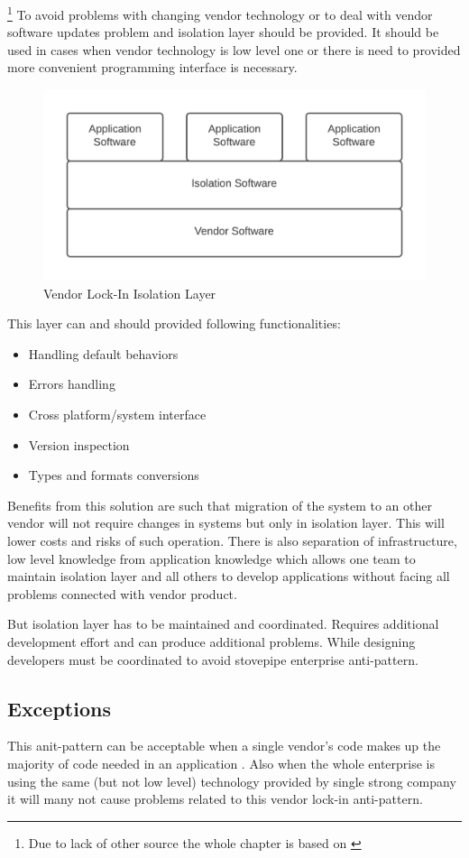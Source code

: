 \footnote{Due to lack of other source the whole chapter is based on \cite{SurvivalGuide}}
To avoid problems with changing vendor technology or to deal with vendor software updates problem and isolation layer should be provided. It should be used in cases when vendor technology is low level one or there is need to provided more convenient programming interface is necessary.

\begin{figure}[!h]
    \centering
    \includegraphics[scale=0.3]{Images/vendorsolution.png}
    \caption[Vendor Lock-In Isolation Layer]{Vendor Lock-In Isolation Layer \cite{SurvivalGuide}}
    \label{fig:vendorsolution}
\end{figure}

This layer can and should provided following functionalities:
\begin{itemize}
\item Handling default behaviors
\item Errors handling
\item Cross platform/system interface
\item Version inspection
\item Types and formats conversions
\end{itemize}
Benefits from this solution are such that migration of the system to an other vendor will not require changes in systems but only in isolation layer. This will lower costs and risks of such operation. There is also separation of infrastructure, low level knowledge from application knowledge which allows one team to maintain isolation layer and all others to develop applications without facing all problems connected with vendor product.

But isolation layer has to be maintained and coordinated. Requires additional development effort and can produce additional problems. While designing developers must be coordinated to avoid stovepipe enterprise anti-pattern.

\subsection{Exceptions}

This anit-pattern can be acceptable when a single vendor's code makes up the majority of code needed in an application \cite{SurvivalGuide}. Also when the whole enterprise is using the same (but not low level) technology provided by single strong company it will many not cause problems related to this vendor lock-in anti-pattern. 